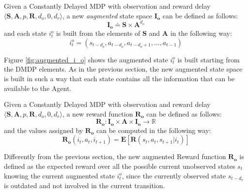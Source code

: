                 \begin{definition}
                    \label{def:obsaugmentstate}
                    Given a Constantly Delayed MDP with observation and reward delay $\langle \mathbf{S}, \mathbf{A}, p, \mathbf{R}, d_o, 0, d_r \rangle$,
                    a new \textit{augmented} state space $\mathbf{I_{o}}$ can be defined as follows:
                    \[ \mathbf{I_{o}} \doteq \mathbf{S} \times \mathbf{A}^{d_o} \]
                    and each state $i^o_t$ is built from the elements of $\mathbf{S}$ and $\mathbf{A}$ in the following way:
                    \[ i_t^o= \left( s_{t-d_{o}}, a_{t-d_{o}}, a_{t-d_{o}+1}, ..., a_{t-1} \right)\]
                \end{definition}
                
                Figure \ref{fig:augmented_i_o} shows the augmented state $i_t^o$ is built starting from the DMDP elements. As in the previous section, the new augmented state space is built in such a way that each state contains all the information that can be available to the Agent.
                
                \begin{definition}
                    \label{def:obsaugmentreward}
                    Given a Constantly Delayed MDP with observation and reward delay $ \langle \mathbf{S}, \mathbf{A}, p, \mathbf{R}, d_o, 0, d_r \rangle$,
                    a new reward function $\mathbf{R_{o}}$ can be defined as follows:
                    \[ \mathbf{R_{o}}: \mathbf{I_{o}} \times \mathbf{A} \times \mathbf{I_{o}} \rightarrow \mathds{R}\]
                    and the values assigned by $\mathbf{R_{o}}$ can be computed in the following way:
                    \[ \mathbf{R_{o}}\left( i_t, a_{t}, i_{t+1} \right) = \mathbf{E} \left[ \mathbf{R} \left( s_t, a_t, s_{t+1} | i_t \right) \right] \]
                \end{definition}
                
                Differently from the previous section, the new augmented Reward function $\mathbf{R_o}$ is defined as the expected reward over all the possible current unobserved states $s_t$ knowing the current augmented state $i^o_t$, since the currently observed state $s_{t-d_{o}}$ is outdated and not involved in the current transition. 
                
